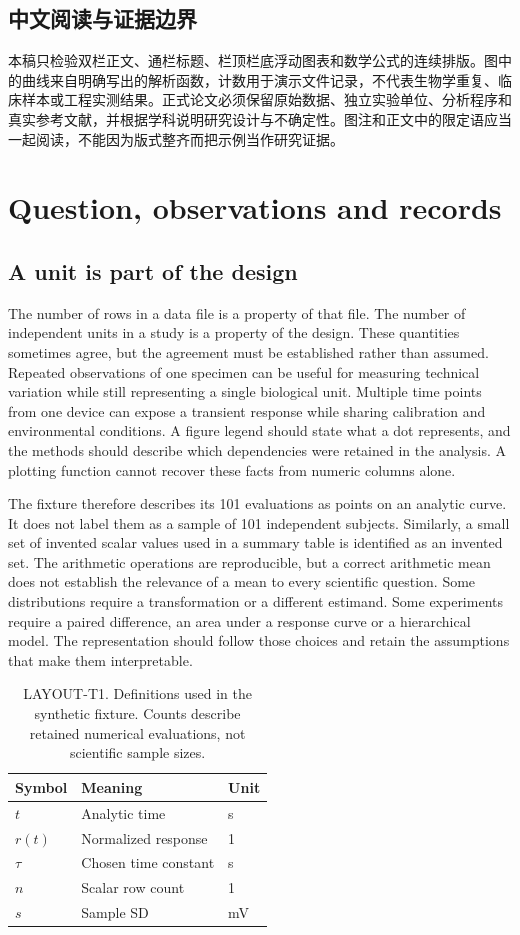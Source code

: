 \ifdefined\sciencebilingual
\subsection{中文阅读与证据边界}
本稿只检验双栏正文、通栏标题、栏顶栏底浮动图表和数学公式的连续排版。图中的曲线来自明确写出的解析函数，计数用于演示文件记录，不代表生物学重复、临床样本或工程实测结果。正式论文必须保留原始数据、独立实验单位、分析程序和真实参考文献，并根据学科说明研究设计与不确定性。图注和正文中的限定语应当一起阅读，不能因为版式整齐而把示例当作研究证据。
\fi

\section{Question, observations and records}
\subsection{A unit is part of the design}
The number of rows in a data file is a property of that file. The number of independent units in a study is a property of the design. These quantities sometimes agree, but the agreement must be established rather than assumed. Repeated observations of one specimen can be useful for measuring technical variation while still representing a single biological unit. Multiple time points from one device can expose a transient response while sharing calibration and environmental conditions. A figure legend should state what a dot represents, and the methods should describe which dependencies were retained in the analysis. A plotting function cannot recover these facts from numeric columns alone.

The fixture therefore describes its 101 evaluations as points on an analytic curve. It does not label them as a sample of 101 independent subjects. Similarly, a small set of invented scalar values used in a summary table is identified as an invented set. The arithmetic operations are reproducible, but a correct arithmetic mean does not establish the relevance of a mean to every scientific question. Some distributions require a transformation or a different estimand. Some experiments require a paired difference, an area under a response curve or a hierarchical model. The representation should follow those choices and retain the assumptions that make them interpretable.

\begin{table}[tb]
\caption{LAYOUT-T1. Definitions used in the synthetic fixture. Counts describe retained numerical evaluations, not scientific sample sizes.}\label{tab:definitions}
\centering\small
\begin{tabular}{@{}lll@{}}\toprule
Symbol & Meaning & Unit \\ \midrule
$t$ & Analytic time & s \\
$r(t)$ & Normalized response & 1 \\
$\tau$ & Chosen time constant & s \\
$n$ & Scalar row count & 1 \\
$s$ & Sample SD & mV \\ \bottomrule
\end{tabular}
\end{table}

